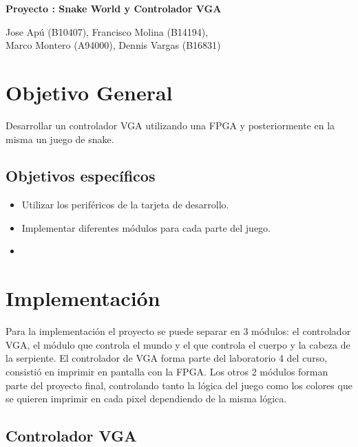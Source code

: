 \documentclass[10pt]{article}
\begin{document}
\begin{huge}
\begin{center}
\textbf{Proyecto : Snake World y Controlador VGA}
\end{center}
\end{huge}

\begin{Large}
\begin{center}
Jose Apú (B10407), Francisco Molina (B14194), \\Marco Montero (A94000), Dennis Vargas (B16831)
\end{center}
\end{Large}

\section{Objetivo General}

Desarrollar un controlador VGA utilizando una FPGA y posteriormente en la misma un juego de snake.\\[0.3 cm] \cite{papilio}

\subsection{Objetivos específicos}
\begin{itemize}
\item Utilizar los periféricos de la tarjeta de desarrollo.
\item Implementar diferentes módulos para cada parte del juego.
\item 
\end{itemize}

\section{Implementación}
Para la implementación el proyecto se puede separar en 3 módulos: el controlador VGA, el módulo que controla el mundo y el que controla el cuerpo y la cabeza de la serpiente. El controlador de VGA forma parte del laboratorio 4 del curso, consistió en imprimir en pantalla con la FPGA. Los otros 2 módulos forman parte del proyecto final, controlando tanto la lógica del juego como los colores que se quieren imprimir en cada pixel dependiendo de la misma lógica.
\subsection{Controlador VGA}
\end{document}
